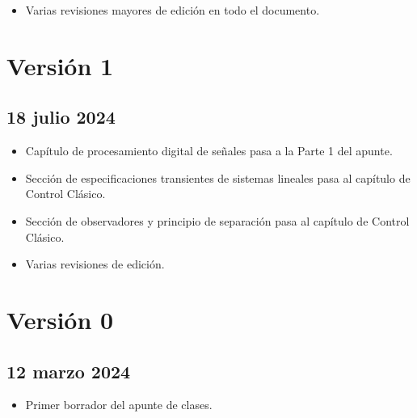 \begin{itemize}
    \item Varias revisiones mayores de edición en todo el documento.
\end{itemize}

\section*{Versión 1}
\subsection*{18 julio 2024}

\begin{itemize}
    \item Capítulo de procesamiento digital de señales pasa a la Parte 1 del apunte.
    \item Sección de especificaciones transientes de sistemas lineales pasa al capítulo de Control Clásico.
    \item Sección de observadores y principio de separación pasa al capítulo de Control Clásico.
    \item Varias revisiones de edición.
\end{itemize}

\section*{Versión 0}
\subsection*{12 marzo 2024}

\begin{itemize}
    \item Primer borrador del apunte de clases.
\end{itemize}